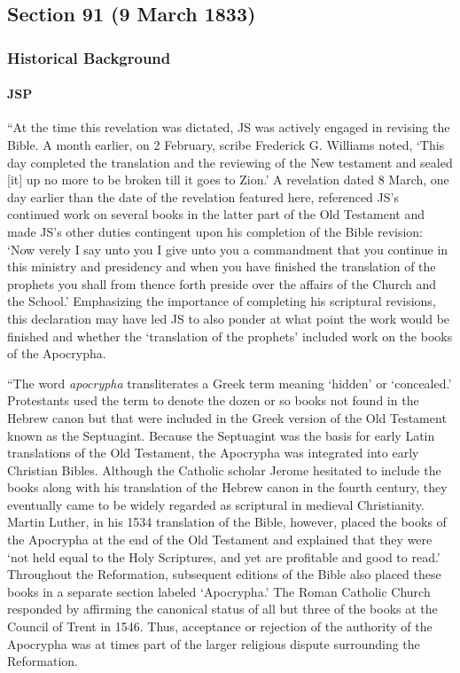 \subsection{Section 91 (9 March 1833)}
	\label{DC91}
	
	\subsubsection{Historical Background}
		\label{DC91-HB}
		
		\paragraph{JSP}
		
			``At the time this revelation was dictated, JS was actively engaged in revising the Bible. A month earlier, on 2 February, scribe Frederick G. Williams noted, `This day completed the translation and the reviewing of the New testament and sealed [it] up no more to be broken till it goes to Zion.' A revelation dated 8 March, one day earlier than the date of the revelation featured here, referenced JS's continued work on several books in the latter part of the Old Testament and made JS's other duties contingent upon his completion of the Bible revision: `Now verely I say unto you I give unto you a commandment that you continue in this ministry and presidency and when you have finished the translation of the prophets you shall from thence forth preside over the affairs of the Church and the School.' Emphasizing the importance of completing his scriptural revisions, this declaration may have led JS to also ponder at what point the work would be finished and whether the `translation of the prophets' included work on the books of the Apocrypha.
			
			``The word \textit{apocrypha} transliterates a Greek term meaning `hidden' or `concealed.' Protestants used the term to denote the dozen or so books not found in the Hebrew canon but that were included in the Greek version of the Old Testament known as the Septuagint. Because the Septuagint was the basis for early Latin translations of the Old Testament, the Apocrypha was integrated into early Christian Bibles. Although the Catholic scholar Jerome hesitated to include the books along with his translation of the Hebrew canon in the fourth century, they eventually came to be widely regarded as scriptural in medieval Christianity. Martin Luther, in his 1534 translation of the Bible, however, placed the books of the Apocrypha at the end of the Old Testament and explained that they were `not held equal to the Holy Scriptures, and yet are profitable and good to read.' Throughout the Reformation, subsequent editions of the Bible also placed these books in a separate section labeled `Apocrypha.' The Roman Catholic Church responded by affirming the canonical status of all but three of the books at the Council of Trent in 1546. Thus, acceptance or rejection of the authority of the Apocrypha was at times part of the larger religious dispute surrounding the Reformation.
			
